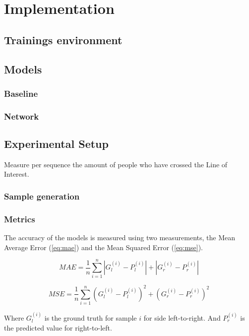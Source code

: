 \chapter{Implementation}

\section{Trainings environment}

\section{Models}
\subsection{Baseline}
\subsection{Network}

\section{Experimental Setup}
Measure per sequence the amount of people who have crossed the Line of Interest.

\subsection{Sample generation}

\subsection{Metrics}
The accuracy of the models is measured using two measurements, the Mean Average Error (\ref{eq:mae}) and the Mean Squared Error (\ref{eq:mse}).

\begin{equation}
\label{eq:mae}
	MAE = \frac{1}{n}\sum^n_{i=1}|G_l^{(i)}-P_l^{(i)}|+|G_r^{(i)}-P_r^{(i)}|
\end{equation}

\begin{equation}
\label{eq:mse}
	MSE = \frac{1}{n}\sum^n_{i=1}(G_l^{(i)}-P_l^{(i)})^2+(G_r^{(i)}-P_r^{(i)})^2
\end{equation}

Where $G_l^{(i)}$ is the ground truth for sample $i$ for side left-to-right. And $P_r^{(i)}$ is the predicted value for right-to-left.